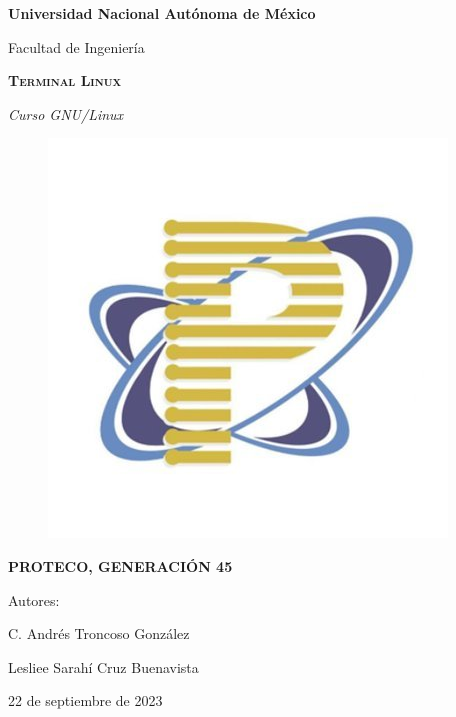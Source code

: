 \documentclass[letter,12pt]{article} %
\begin{document}
\thispagestyle{empty}
\begin{titlepage}
\centering
{\bfseries\huge Universidad Nacional Autónoma de México\par}
\vspace{0.5cm}
{\LARGE Facultad de Ingeniería\par}
\vfill
{\bfseries\scshape\Huge Terminal Linux \par}
\vspace{0.5cm}
{\itshape\Large Curso GNU/Linux \par}

\begin{figure}[H]
	\centering
	\includegraphics[scale=0.4]{imagenes/proteco.png}
\end{figure}
\vspace{0.5cm}\vspace{0.3cm} \large{\bf PROTECO, GENERACIÓN 45}\\
\vspace{\baselineskip}
{\Large Autores: \par}
{\Large C. Andrés Troncoso González \par}
{\Large Lesliee Sarahí Cruz Buenavista\par}
\vfill
{\Large 22 de septiembre de 2023\par}
\end{titlepage}
\newpage
\date{}
\justifying
\tableofcontents
\newpage
\end{document}

